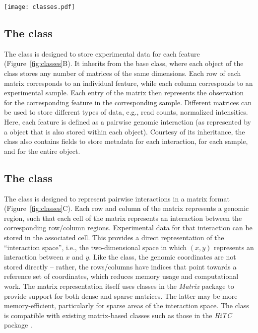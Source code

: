 \documentclass[10pt,a4paper,twocolumn]{article}
\begin{document}
\begin{figure*}
\centering
\texttt{[image: classes.pdf]}
\caption{Overview of the classes in the \textit{InteractionSet} package.
(A) The  class represents pairwise interactions between genomic regions by storing pairs of anchor indices that refer to coordinates in a  object.
(B) The  class stores experimental data in a matrix where each row is an interaction and each column is a sample.
(C) The  class represents the interaction space as a matrix, where each cell represents an interaction between the corresponding row/column regions.
}
\label{fig:classes}
\end{figure*}

\subsection*{The  class}
The  class is designed to store experimental data for each feature (Figure~\ref{fig:classes}B).
It inherits from the  base class, where each object of the class stores any number of matrices of the same dimensions.
Each row of each matrix corresponds to an individual feature, while each column corresponds to an experimental sample.
Each entry of the matrix then represents the observation for the corresponding feature in the corresponding sample.
Different matrices can be used to store different types of data, e.g., read counts, normalized intensities.
Here, each feature is defined as a pairwise genomic interaction (as represented by a  object that is also stored within each  object).
Courtesy of its inheritance, the  class also contains fields to store metadata for each interaction, for each sample, and for the entire object.

\subsection*{The  class}
The  class is designed to represent pairwise interactions in a matrix format (Figure~\ref{fig:classes}C).
Each row and column of the matrix represents a genomic region, such that each cell of the matrix represents an interaction between the corresponding row/column regions.
Experimental data for that interaction can be stored in the associated cell.
This provides a direct representation of the ``interaction space'', i.e., the two-dimensional space in which $(x, y)$ represents an interaction between $x$ and $y$.
Like the  class, the genomic coordinates are not stored directly -- rather, the rows/columns have indices that point towards a reference set of coordinates, which reduces memory usage and computational work.
The matrix representation itself uses classes in the \textit{Matrix} package to provide support for both dense and sparse matrices.
The latter may be more memory-efficient, particularly for sparse areas of the interaction space.
The  class is compatible with existing matrix-based classes such as those in the \textit{HiTC} package \cite{servant2012hitc}.
\end{document}

